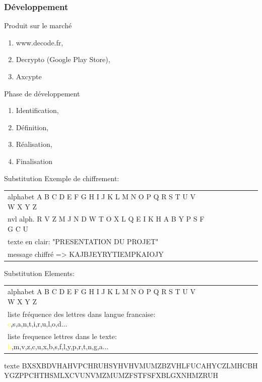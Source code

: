 \documentclass[10pt,xcolor=table]{beamer}
\begin{document}
\begin{frame}[<+->]
  \frametitle{Développement}
  
  \begin{exampleblock}{Produit sur le marché}
	\begin{enumerate}
    \item www.decode.fr,
    \item Decrypto (Google Play Store),
    \item Axcypte
    \end{enumerate}
  \end{exampleblock}

  \begin{block}{Phase de développement}
   
    \begin{enumerate}
    \item Identification,
    \item Définition,
    \item Réalisation,
    \item Finalisation
    \end{enumerate}
  \end{block}

\end{frame}
\begin{frame}
\begin{exampleblock}{Substitution} %
Exemple de chiffrement:
\begin{tabular}{l!{\vrule}ccccccc} 
alphabet A B C D E F G H I J K L M N O P Q R S T U V W X Y Z \pause \\  
nvl alph. R V Z M J N D W T O X L Q E I K H A B Y P S F G C U  \pause \\ 
texte en clair: "PRESENTATION DU PROJET" \pause  \\ 
message chiffré => KAJBJEYRYTIEMPKAIOJY \\
\end{tabular}
\end{exampleblock}
\end{frame}




\begin{frame}
\begin{exampleblock}{Substitution} %
Elements:
\begin{tabular}{l!{\vrule}ccccccc} 
alphabet A B C D E F G H I J K L M N O P Q R S T U V W X Y Z \\   
liste fréquence des lettres dans langue francaise: \textcolor{yellow}{e},s,a,n,t,i,r,u,l,o,d...\\ 
liste frequence lettres dans le texte: \textcolor{yellow}{h},m,v,z,c,u,x,b,s,f,l,y,p,r,t,n,g,a...
\end{tabular}
\end{exampleblock}
\begin{exampleblock}{texte}
BXSXBDVHAHVPCHRUHSYHVHVMUMZBZVHLFUCAHYCZLMHCBH
YGZPPCHTHSMLXCVUNVMZMUMZFSTFSFXBLGXNHMZRUH
\end{exampleblock}
\end{frame}
\end{document}
